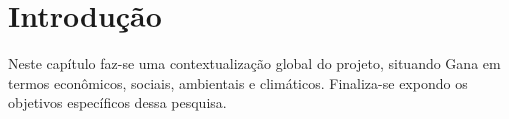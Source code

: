 \chapter{Introdução}


Neste capítulo faz-se uma contextualização global do projeto, 
situando Gana em termos econômicos, sociais, ambientais e climáticos.
Finaliza-se expondo os objetivos específicos dessa pesquisa. 





